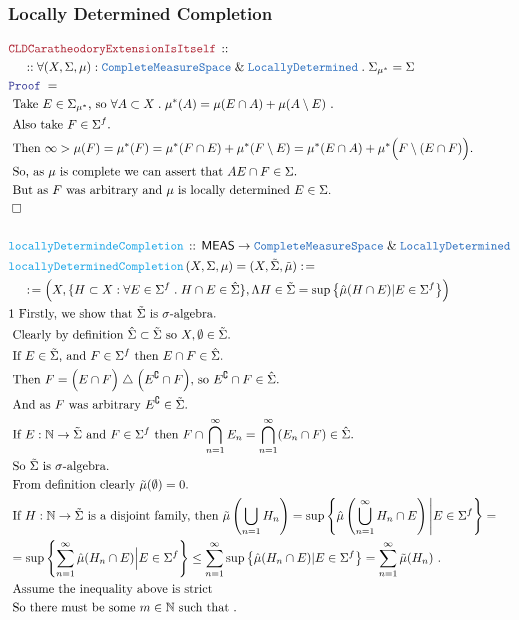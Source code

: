 \documentclass[12pt]{scrartcl}
\newcommand{\TYPE}[1]{\textcolor{NavyBlue}{\mathtt{#1}}}
\newcommand{\FUNC}[1]{\textcolor{Cerulean}{\mathtt{#1}}}
\newcommand{\LOGIC}[1]{\textcolor{Blue}{\mathtt{#1}}}
\newcommand{\THM}[1]{\textcolor{Maroon}{\mathtt{#1}}}
\renewcommand{\.}{\; . \;}
\newcommand{\de}{: \kern 0.1pc =}
\newcommand{\Act}[1]{\left( #1 \right)}
\newcommand{\Theorem}[2]{& \THM{#1} \, :: \, #2 \\ & \Proof = \\ }
\newcommand{\DeclareFunc}[2]{& \FUNC{#1} \, :: \, #2 \\}
\newcommand{\DefineNamedFunc}[4]{&  \FUNC{#1}\Act{#2} = #3 \de #4 \\}
\newcommand{\NewLine}{\\ & \kern 1pc}
\newcommand{\Page}[1]{ \begin{align*} #1 \end{align*}   }
\renewcommand{\And}{\; \& \;}
\newcommand{\Nat}{\mathbb{N} }
\newcommand{\du}{\; \triangle \;}
\renewcommand{\c}{\complement}
\newcommand{\QED}{\; \square}
\newcommand{\EndProof}{& \QED \\}
\newcommand{\Proof}{\LOGIC{Proof} \; }
\newcommand{\Explain}[1]{& \text{#1.} \\}
\newcommand{\ExplainFurther}[1]{& \text{#1} \\}
\newcommand{\CMS}{\TYPE{CompleteMeasureSpace}}
\newcommand{\LocDet}{\TYPE{LocallyDetermined}}
\newcommand{\MEAS}{\mathsf{MEAS}}
\begin{document}
\subsubsection{Locally Determined Completion}
\Page{
	\Theorem{CLDCaratheodoryExtensionIsItself}
	{
		\NewLine ::		
		\forall (X,\Sigma,\mu) : \CMS \And \LocDet \.
		\Sigma_{\mu^*} = \Sigma
	}
	\Explain{ 
		Take $E \in \Sigma_{\mu^*}$, so $\forall A \subset X \. \mu^*(A) = \mu(E \cap A) + \mu(A \setminus E)$ }
	\Explain{
		Also take $F \in \Sigma^f$}
	\Explain{
		Then $\infty > \mu(F) = \mu^*(F) = \mu^*(F \cap E) + \mu^*(F \setminus E ) = 
			\mu^*(E \cap A) + \mu^*\Big(F \setminus (E \cap F ) \Big)$}
	\Explain{
		So,  as $\mu$ is complete we can assert that $AE\cap F \in \Sigma$}
	\Explain{
		But as $F$ was arbitrary and $\mu$ is locally determined $E \in \Sigma$}
	\EndProof
	\\
	\DeclareFunc{locallyDetermindeCompletion}
	{
		\MEAS \to \CMS \And \LocDet
	}
	\DefineNamedFunc{locallyDeterminedCompletion}
	{X,\Sigma,\mu}{(X,\tilde \Sigma,\tilde \mu)}
	{
		\NewLine \de		
		\Big( X, \{ H \subset X : \forall E \in \Sigma^f \. H \cap E \in \hat \Sigma \},    
		\Lambda H \in \tilde \Sigma = \sup \big\{  \hat \mu(H \cap E) | E \in \Sigma^f  \big\} \Big)
	}
	\Explain{1
		Firstly, we show that $\tilde \Sigma$ is $\sigma$-algebra}
	\Explain{
		Clearly by definition $\hat \Sigma \subset \tilde \Sigma$ so $X,\emptyset \in \tilde \Sigma$}
	\Explain{
		If $E \in \tilde \Sigma$, and $F \in \Sigma^f$ then $E \cap F \in \hat \Sigma$}
	\Explain{
		Then $F = \Big(E \cap F\Big) \du \Big(E^\c \cap F\Big)$, 
		so $E^\c \cap F \in \hat \Sigma$}
	\Explain{
		And as $F$ was arbitrary $E^\c \in \tilde\Sigma$}
	\Explain{ 
		If $E : \Nat \to \tilde \Sigma$ and 
		$ F \in \Sigma^f$ then 
		$F \cap \bigcap^\infty_{n=1} E_n  =  \bigcap^\infty_{n=1} (E_n \cap F) \in \hat \Sigma $}
	\Explain{
		So $\tilde \Sigma$ is $\sigma$-algebra}
	\Explain{
		From definition clearly $\tilde \mu(\emptyset) = 0$}
	\ExplainFurther{
		If $H : \Nat \to \tilde \Sigma$ is a disjoint family, then
		$
			\tilde \mu\left( \bigcup_{n=1} H_n \right) =
			\sup  \left\{  \hat \mu\left( \bigcup^\infty_{n=1 } H_n \cap E\right) \Bigg| E \in \Sigma^f  \right\} =
		$	
	}
	\Explain{
		$
			= \sup  \left\{ \sum^\infty_{n=1} 
			\hat \mu( H_n \cap E) \Big| E \in \Sigma^f  \right\}
			\le
			\sum^\infty_{n=1} \sup \big\{ \hat \mu(H_n \cap E) | E \in \Sigma^f \big\} =
			\sum^\infty_{n=1} \tilde \mu(H_n)
		$
	}
	\ExplainFurther{
		Assume the inequality above is strict}
	\Explain{
		So there must be some $m \in \Nat$
		such that 
}}
\end{document}
